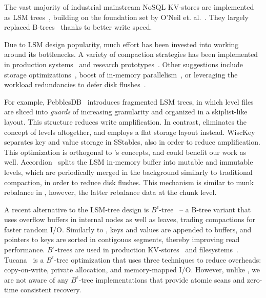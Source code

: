 

The vast majority of industrial mainstream NoSQL KV-stores are  implemented as LSM trees~\cite{hbase, 
RocksDB, scylladb, Bigtable2008, cassandra2010}, building on the foundation set by O'Neil 
et. al.~\cite{O'Neil1996, Muth1998}. They largely replaced B-trees~\cite{Knuth:1997}
thanks to better write speed. 

Due to LSM design popularity, much effort has been invested into working around its bottlenecks.
A variety of compaction strategies has been implemented in production systems~\cite{CallaghanCompaction, 
ScyllaCompaction} and research prototypes~\cite{triad, PebblesDB}. Other suggestions include storage
optimizations~\cite{WiscKey, PebblesDB}, boost of in-memory parallelism~\cite{scylladb, clsm2015}, or leveraging 
the workload redundancies to defer disk flushes~\cite{triad, accordion}. 

For example, PebblesDB~\cite{PebblesDB} introduces fragmented LSM trees, in which level files are 
sliced into {\em guards\/} of increasing granularity and organized in a skiplist-like layout. This structure 
reduces write amplification. In contrast, \sys\/ eliminates the concept of levels altogether, 
and employs a flat storage layout instead. WiscKey~\cite{WiscKey} separates key and value storage 
in SStables, also in order to reduce amplification. This optimization is orthogonal to \sys's concepts,
and could benefit our work as well. Accordion~\cite{accordion} splits the LSM in-memory buffer into mutable 
and immutable levels, which are periodically merged in the background similarly to traditional compaction, 
in order to reduce disk flushes. This mechanism is similar to munk rebalance in \sys, 
however, the latter rebalance data at the chunk level.

A recent alternative to the LSM-tree design is $B^{\epsilon}$-tree~\cite{Brodal:2003:LBE:644108.644201} -- a 
B-tree variant that uses overflow buffers in internal nodes as well as leaves, trading compactions for faster random I/O. 
Similarly to \sys, keys and values are appended to buffers, and pointers to keys are sorted in contigouos segments, 
thereby improving read performance. $B^{\epsilon}$-trees are used in production KV-stores~\cite{TokuDB} and filesystems~\cite{BetrFS}. 
Tucana~\cite{tucana} is a $B^{\epsilon}$-tree optimization that uses three techniques to reduce overheads: copy-on-write, private allocation, 
and memory-mapped I/O. However, unlike \sys, we are not aware of any $B^{\epsilon}$-tree implementations that provide atomic scans 
and zero-time consistent recovery. 


